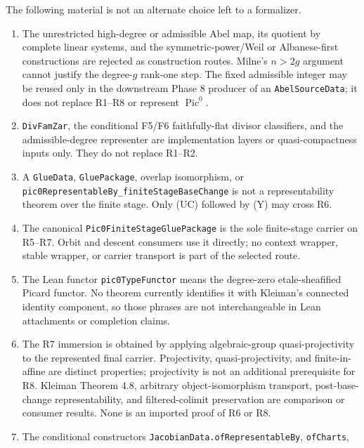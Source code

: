 \begin{remark}
  \label{route-app-quarantine}

  The following material is not an alternate choice left to a formalizer.
  \begin{enumerate}
  \item The unrestricted high-degree or admissible Abel map, its quotient by
    complete linear systems, and the symmetric-power/Weil or Albanese-first
    constructions are rejected as construction routes.  Milne's
    \(n>2g\) argument cannot justify the degree-\(g\) rank-one step.  The fixed
    admissible integer may be reused only in the downstream Phase 8 producer
    of an \texttt{AbelSourceData}; it does not replace R1--R8 or represent
    \(\operatorname{Pic}^0\).
  \item \texttt{DivFamZar}, the conditional F5/F6 faithfully-flat divisor
    classifiers, and the admissible-degree representer are implementation
    layers or quasi-compactness inputs only.  They do not replace R1--R2.
  \item A \texttt{GlueData}, \texttt{GluePackage}, overlap isomorphism, or
    \texttt{pic0RepresentableBy\_finiteStageBaseChange} is not a
    representability theorem over the finite stage.  Only (UC) followed by
    (Y) may cross R6.
  \item The canonical \texttt{Pic0FiniteStageGluePackage} is the sole
    finite-stage carrier on R5--R7.  Orbit and descent consumers use it
    directly; no context wrapper, stable wrapper, or carrier transport is
    part of the selected route.
  \item The Lean functor \texttt{pic0TypeFunctor} means the degree-zero
    etale-sheafified Picard functor.  No theorem currently identifies it with
    Kleiman's connected identity component, so those phrases are not
    interchangeable in Lean attachments or completion claims.
  \item The R7 immersion is obtained by applying algebraic-group
    quasi-projectivity to the represented final carrier.  Projectivity,
    quasi-projectivity, and finite-in-affine are distinct properties;
    projectivity is not an additional prerequisite for R8.  Kleiman Theorem 4.8,
    arbitrary object-isomorphism transport,
    post-base-change representability, and filtered-colimit preservation are
    comparison or consumer results.  None is an imported proof of R6 or R8.
  \item The conditional constructors
    \texttt{JacobianData.ofRepresentableBy}, \texttt{ofCharts},

\end{enumerate}
\end{remark}
